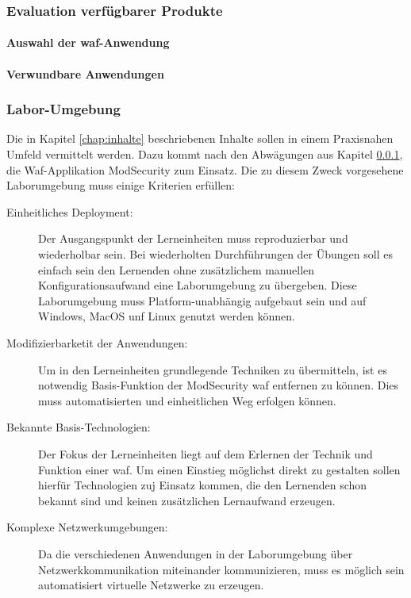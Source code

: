 \subsubsection{Evaluation verfügbarer Produkte}
\label{chap:produkt-eval}
\paragraph{Auswahl der \ac{waf}-Anwendung}

\paragraph{Verwundbare Anwendungen}

\subsubsection{Labor-Umgebung}


Die in Kapitel \ref{chap:inhalte} beschriebenen Inhalte sollen in einem Praxisnahen Umfeld vermittelt werden.
Dazu kommt nach den Abwägungen aus Kapitel \ref{chap:produkt-eval}, die Waf-Applikation ModSecurity zum Einsatz.
Die zu diesem Zweck vorgesehene Laborumgebung muss einige Kriterien erfüllen:
\begin{description}
    \item[Einheitliches Deployment:] Der Ausgangspunkt der Lerneinheiten muss reproduzierbar und wiederholbar sein. 
    Bei wiederholten Durchführungen der Übungen soll es einfach sein den Lernenden ohne zusätzlichem manuellen Konfigurationsaufwand eine Laborumgebung zu übergeben. 
    Diese Laborumgebung muss Platform-unabhängig aufgebaut sein und auf Windows, MacOS unf Linux genutzt werden können.
    \item[Modifizierbarketit der Anwendungen:] Um in den Lerneinheiten grundlegende Techniken zu übermitteln, ist es notwendig Basis-Funktion der ModSecurity \ac{waf} entfernen zu können. 
    Dies muss automatisierten und einheitlichen Weg erfolgen können.
    \item[Bekannte Basis-Technologien:] Der Fokus der Lerneinheiten liegt auf dem Erlernen der Technik und Funktion einer \ac{waf}. 
    Um einen Einstieg möglichst direkt zu gestalten sollen hierfür Technologien zuj Einsatz kommen, die den Lernenden schon bekannt sind und keinen zusätzlichen Lernaufwand erzeugen.
    \item[Komplexe Netzwerkumgebungen:] Da die verschiedenen Anwendungen in der Laborumgebung über Netzwerkkommunikation miteinander kommunizieren, muss es möglich sein automatisiert virtuelle Netzwerke zu erzeugen.
\end{description}


